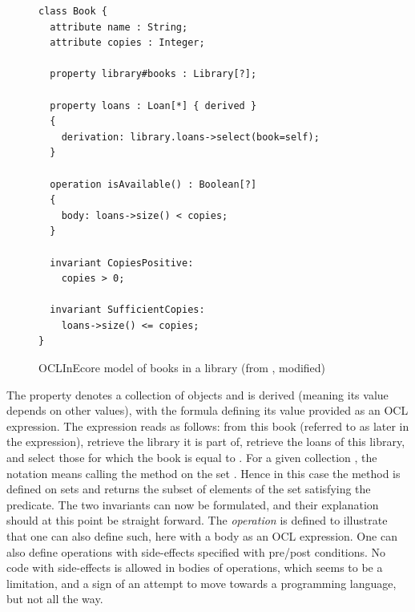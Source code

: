 \begin{figure}
\begin{lstlisting}[language=oclinecore,frame=single,backgroundcolor=\color{light-gray}]
class Book {
  attribute name : String;
  attribute copies : Integer;

  property library#books : Library[?];
     
  property loans : Loan[*] { derived }
  {
    derivation: library.loans->select(book=self);
  }

  operation isAvailable() : Boolean[?]
  {
    body: loans->size() < copies;
  }
     
  invariant CopiesPositive:
    copies > 0;
     
  invariant SufficientCopies:
    loans->size() <= copies;     
}
\end{lstlisting}
\caption{OCLInEcore model of books in a library (from \cite{oclinecoreTutorial}, modified)}
\label{fig:book-oclinecore}
\end{figure}

The property  denotes a collection of  
objects and is derived (meaning its value depends on other values), 
with the formula defining 
its value provided as an OCL expression.
The expression reads as follows: from this book (referred to as 
 later in the expression), retrieve the library it is 
part of, retrieve the 
loans of this library, and select those for which the book is 
equal to . For a given collection , the 
notation  means calling the method  on the 
set . Hence in this case the
 method is defined on sets and returns the 
subset of elements of the set satisfying the predicate.
The two invariants can now be formulated, and their explanation should at this point be straight forward.
The {\em operation}  is defined to illustrate that one can also define such, here with a body as an 
OCL expression. One can also define operations with side-effects specified with pre/post conditions. No code with side-effects is allowed in 
bodies of operations, which seems to be a limitation, and a sign
of an attempt to move towards a programming language, but not all
the way.


